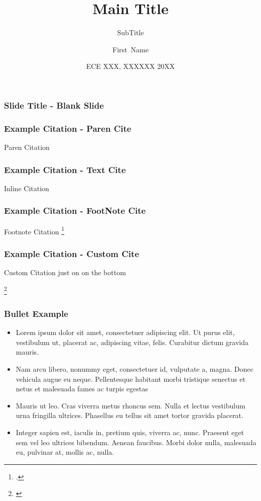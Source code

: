 \documentclass[xcolor=dvipsnames]{beamer} %
\title[Footer Title] %
{Main Title}
\subtitle{SubTitle}
\author[Name] %
{First~Name}
\institute[George Mason University]{
  Capacity\\
  Department of XXXX\\
  George Mason University
}
\date[XXXXX XXXst 20XX] %
{ECE XXX, XXXXXX 20XX}
\newcommand{\customcite}[1]{%

  \begingroup

  \renewcommand\thefootnote{}%

  \footnote{\cite{#1}} %

  \addtocounter{footnote}{-1}%

  \endgroup

}
\begin{document}



\frame{\titlepage}

\begin{frame}
\frametitle{Slide Title - Blank Slide}

\end{frame}


\begin{frame}
\frametitle{Example Citation - Paren Cite}
Paren Citation \parencite{8354596}
\end{frame}


\begin{frame}
\frametitle{Example Citation - Text Cite}
Inline Citation \textcite{10.1145/3240765.3240842}
\end{frame}

\begin{frame}
\frametitle{Example Citation - FootNote Cite}
Footnote Citation \footcite{10.1007/s10710-005-2985-x}
\end{frame}

\begin{frame}
\frametitle{Example Citation - Custom Cite}
Custom Citation just on on the bottom \customcite{8354596}
\end{frame}


\begin{frame}
\frametitle{Bullet Example}
\begin{itemize}
    \item Lorem ipsum dolor sit amet, consectetuer adipiscing elit. Ut purus
elit, vestibulum ut, placerat ac, adipiscing vitae, felis. Curabitur
dictum gravida mauris. 
    \item Nam arcu libero, nonummy eget, consectetuer
id, vulputate a, magna. Donec vehicula augue eu neque. Pellentesque
habitant morbi tristique senectus et netus et malesuada fames ac
turpis egestas
    \item Mauris ut leo. Cras viverra metus rhoncus sem. Nulla
et lectus vestibulum urna fringilla ultrices. Phasellus eu tellus sit amet
tortor gravida placerat.
    \item Integer sapien est, iaculis in, pretium quis,
viverra ac, nunc. Praesent eget sem vel leo ultrices bibendum.
Aenean faucibus. Morbi dolor nulla, malesuada eu, pulvinar at, mollis
ac, nulla.
\end{itemize}
    \begin{center}
    \end{center}


\end{frame}
\end{document}

